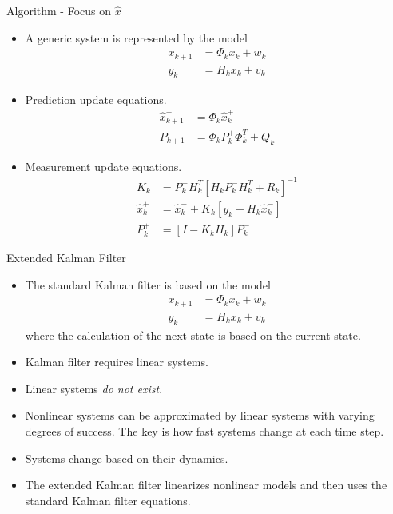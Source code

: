 \documentclass[hyperref={pdfpagelabels=false}]{beamer}
\begin{document}
\begin{frame}{Algorithm - Focus on $\hat{x}$}
\begin{itemize}
\item A generic system is represented by the model
\begin{align*}
x_{k+1} &= \Phi_kx_k + w_k \\
y_k &= H_kx_k + v_k
\end{align*}
\item Prediction update equations.
\begin{align*}
\hat{x}_{k+1}^- &= \Phi_k\hat{x}_k^+ \\
P_{k+1}^- &= \Phi_kP_k^+\Phi_k^T + Q_k
\end{align*}
\item Measurement update equations.
\begin{align*}
K_k &= P_k^-H_k^T\left[H_kP_k^-H_k^T + R_k\right]^{-1} \\
\hat{x}_k^+ &= \hat{x}_k^- + K_k\left[y_k - H_k\hat{x}_k^-\right] \\
P_k^+ &= \left[I - K_kH_k\right]P_k^-
\end{align*}
\end{itemize}
\end{frame}

\begin{frame}{Extended Kalman Filter}
\begin{itemize}
\item The standard Kalman filter is based on the model
\begin{align*}
x_{k+1} &= \Phi_kx_k + w_k \\
y_k &= H_kx_k + v_k
\end{align*}
where the calculation of the next state is based on the current state.
\item Kalman filter requires linear systems.
\item Linear systems \textit{do not exist}.
\item Nonlinear systems can be approximated by linear systems with varying degrees of success. The key is how fast systems change at each time step.
\item Systems change based on their dynamics.
\item The extended Kalman filter linearizes nonlinear models and then uses the standard Kalman filter equations.
\end{itemize}
\end{frame}
\end{document}

